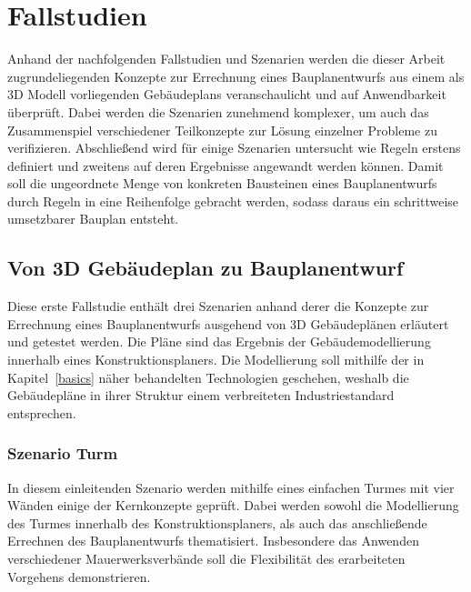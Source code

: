 \chapter{Fallstudien}\label{scenarios}
Anhand der nachfolgenden Fallstudien und Szenarien werden die dieser Arbeit zugrundeliegenden Konzepte zur Errechnung eines Bauplanentwurfs aus einem als 3D Modell vorliegenden Gebäudeplans veranschaulicht und auf Anwendbarkeit überprüft.
Dabei werden die Szenarien zunehmend komplexer, um auch das Zusammenspiel verschiedener Teilkonzepte zur Lösung einzelner Probleme zu verifizieren.
Abschließend wird für einige Szenarien untersucht wie Regeln erstens definiert und zweitens auf deren Ergebnisse angewandt werden können.
Damit soll die ungeordnete Menge von konkreten Bausteinen eines Bauplanentwurfs durch Regeln in eine Reihenfolge gebracht werden, sodass daraus ein schrittweise umsetzbarer Bauplan entsteht.

\section{Von 3D Gebäudeplan zu Bauplanentwurf}
Diese erste Fallstudie enthält drei Szenarien anhand derer die Konzepte zur Errechnung eines Bauplanentwurfs ausgehend von 3D Gebäudeplänen erläutert und getestet werden.
Die Pläne sind das Ergebnis der Gebäudemodellierung innerhalb eines Konstruktionsplaners.
Die Modellierung soll mithilfe der in Kapitel~\ref{basics} näher behandelten Technologien geschehen, weshalb die Gebäudepläne in ihrer Struktur einem verbreiteten Industriestandard entsprechen.

\subsection{Szenario Turm}\label{scenarios:scenario1}
In diesem einleitenden Szenario werden mithilfe eines einfachen Turmes mit vier Wänden einige der Kernkonzepte geprüft.
Dabei werden sowohl die Modellierung des Turmes innerhalb des Konstruktionsplaners, als auch das anschließende Errechnen des Bauplanentwurfs thematisiert.
Insbesondere das Anwenden verschiedener Mauerwerksverbände soll die Flexibilität des erarbeiteten Vorgehens demonstrieren.

